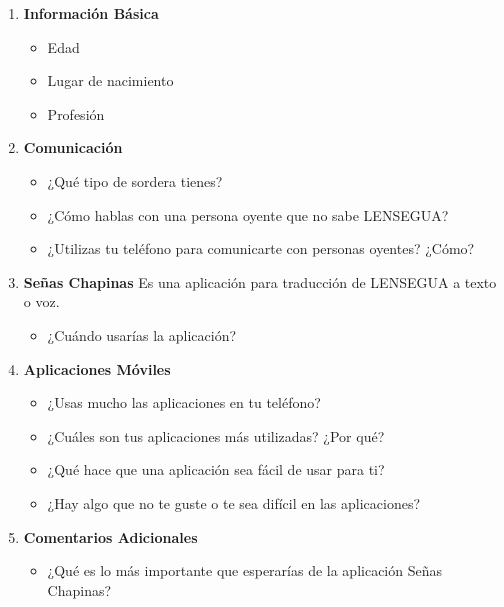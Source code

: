 \begin{enumerate}
    \item \textbf{Información Básica}
    \begin{itemize}
        \item Edad
        \item Lugar de nacimiento
        \item Profesión
    \end{itemize}

    \item \textbf{Comunicación}
    \begin{itemize}
        \item ¿Qué tipo de sordera tienes?
        \item ¿Cómo hablas con una persona oyente que no sabe LENSEGUA?
        \item ¿Utilizas tu teléfono para comunicarte con personas oyentes? ¿Cómo?
    \end{itemize}

    \item \textbf{Señas Chapinas}
    Es una aplicación para traducción de LENSEGUA a texto o voz.
    \begin{itemize}
        \item ¿Cuándo usarías la aplicación?
    \end{itemize}

    \item \textbf{Aplicaciones Móviles}
    \begin{itemize}
        \item ¿Usas mucho las aplicaciones en tu teléfono?
        \item ¿Cuáles son tus aplicaciones más utilizadas? ¿Por qué?
        \item ¿Qué hace que una aplicación sea fácil de usar para ti?
        \item ¿Hay algo que no te guste o te sea difícil en las aplicaciones?
    \end{itemize}

    \item \textbf{Comentarios Adicionales}
    \begin{itemize}
        \item ¿Qué es lo más importante que esperarías de la aplicación Señas Chapinas?
    \end{itemize}
\end{enumerate}
